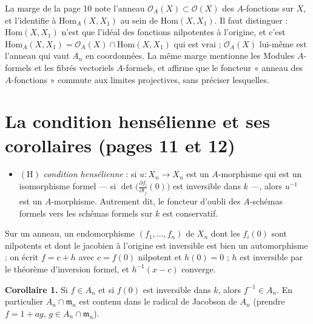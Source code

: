 \documentclass[11pt,a4paper]{article}
\begin{document}
La marge de la page 10 note l'anneau $\mathcal{O}_A(X) \subset \mathcal{O}(X)$ des
$A$-fonctions sur $X$, et l'identifie à $\mathrm{Hom}_A(X, X_1)$ au sein de
$\mathrm{Hom}(X, X_1)$. Il faut distinguer : $\mathrm{Hom}(X, X_1)$ n'est que
l'idéal des fonctions nilpotentes à l'origine, et c'est
$\mathrm{Hom}_A(X, X_1) = \mathcal{O}_A(X) \cap \mathrm{Hom}(X, X_1)$ qui est vrai ;
$\mathcal{O}_A(X)$ lui-même est l'anneau qui vaut $A_n$ en coordonnées. La même
marge mentionne les Modules $A$-formels et les fibrés vectoriels $A$-formels,
et affirme que le foncteur « anneau des $A$-fonctions » commute aux limites
projectives, sans préciser lesquelles.

\section*{La condition hensélienne et ses corollaires (pages 11 et 12)}

\begin{itemize}
  \item $(\mathrm{H})$ \emph{condition hensélienne} : si $u : X_n \to X_n$ est un
    $A$-morphisme qui est un isomorphisme formel — si
    $\det\bigl(\frac{\partial f_i}{\partial t_j}(0)\bigr)$ est inversible dans $k$ —,
    alors $u^{-1}$ est un $A$-morphisme. Autrement dit, le foncteur d'oubli des
    $A$-schémas formels vers les schémas formels sur $k$ est conservatif.
\end{itemize}

Sur un anneau, un endomorphisme $(f_1, \ldots, f_n)$ de $X_n$ dont les $f_i(0)$
sont nilpotents et dont le jacobien à l'origine est inversible est bien un
automorphisme : on écrit $f = c + h$ avec $c = f(0)$ nilpotent et $h(0) = 0$ ;
$h$ est inversible par le théorème d'inversion formel, et $h^{-1}(x - c)$
converge.

\textbf{Corollaire 1.} Si $f \in A_n$ et si $f(0)$ est inversible dans $k$,
alors $f^{-1} \in A_n$. En particulier $A_n \cap \mathfrak{m}_n$ est contenu dans
le radical de Jacobson de $A_n$ (prendre $f = 1 + ag$, $g \in A_n \cap
\mathfrak{m}_n$).
\end{document}
